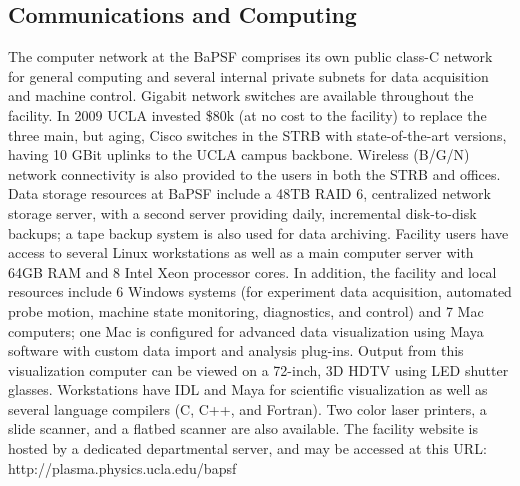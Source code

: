 \documentclass[11pt]{article}
\begin{document}
 \subsection{Communications and Computing}
The computer network at the BaPSF comprises its own public class-C network for general computing and several internal private subnets for data acquisition and machine control. Gigabit network switches are available throughout the facility. In 2009 UCLA invested \$80k (at no cost to the facility) to replace the three main, but aging, Cisco switches in the STRB with state-of-the-art versions, having 10 GBit uplinks to the UCLA campus backbone. Wireless (B/G/N) network connectivity is also provided to the users in both the STRB and offices. 
	Data storage resources at BaPSF include a 48TB RAID 6, centralized network storage server, with a second server providing daily, incremental disk-to-disk backups; a tape backup system is also used for data archiving. Facility users have access to several Linux workstations as well as a main computer server with 64GB RAM and 8 Intel Xeon processor cores. In addition, the facility and local resources include 6 Windows systems (for experiment data acquisition, automated probe motion, machine state monitoring, diagnostics, and control) and 7 Mac computers; one Mac is configured for advanced data visualization using Maya software with custom data import and analysis plug-ins. Output from this visualization computer can be viewed on a 72-inch, 3D HDTV using LED shutter glasses. Workstations have IDL and Maya for scientific visualization as well as several language compilers (C, C++, and Fortran). Two color laser printers, a slide scanner, and a flatbed scanner are also available.  The facility website is hosted by a dedicated departmental server, and may be accessed at this URL: http://plasma.physics.ucla.edu/bapsf



%
%
%
%  
\end{document}
